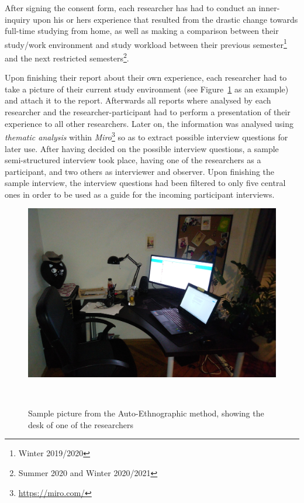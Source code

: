 \documentclass{sigchi}
\begin{document}
After signing the consent form, each researcher has had to conduct an inner-inquiry upon his or hers experience that resulted from the drastic change towards full-time studying from home, as well as making a comparison between their study/work environment and study workload between their previous semester\footnote{Winter 2019/2020} and the next restricted semesters\footnote{Summer 2020 and Winter 2020/2021}.

Upon finishing their report about their own experience, each researcher had to take a picture of their current study environment (see Figure~\ref{fig:figure1} as an example) and attach it to the report. Afterwards all reports where analysed by each researcher and the  researcher-participant had to perform a presentation of their experience to all other researchers. Later on, the information was analysed using \emph{thematic analysis} within \emph{Miro}\footnote{\url{https://miro.com/}} so as to extract possible interview questions for later use. After having decided on the possible interview questions, a sample semi-structured interview took place, having one of the researchers as a participant, and two others as interviewer and observer. Upon finishing the sample interview, the interview questions had been filtered to only five central ones in order to be used as a guide for the incoming participant interviews.
\begin{figure}
\centering
  \includegraphics[width=1\columnwidth]{figures/auto-ethnography.JPG}
  \caption{Sample picture from the Auto-Ethnographic method, showing the desk of one of the researchers}~\label{fig:figure1}
\end{figure}
\end{document}
